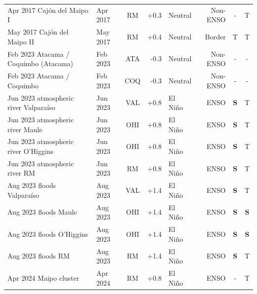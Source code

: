 \begin{table}[H]
\begin{tabular}{p{4.0cm}lcrlrcc}
Apr 2017 Caj\'on del Maipo I & Apr 2017 & RM & +0.3 & Neutral & \textcolor{cohnon}{Non-ENSO} & \textcolor{firenone}{-} & \textcolor{firepartial}{T} \\
May 2017 Caj\'on del Maipo II & May 2017 & RM & +0.4 & Neutral & \textcolor{cohbord}{Border} & \textcolor{firepartial}{T} & \textcolor{firepartial}{T} \\
Feb 2023 Atacama / Coquimbo (Atacama) & Feb 2023 & ATA & -0.3 & Neutral & \textcolor{cohnon}{Non-ENSO} & \textcolor{firenone}{-} & \textcolor{firenone}{-} \\
Feb 2023 Atacama / Coquimbo & Feb 2023 & COQ & -0.3 & Neutral & \textcolor{cohnon}{Non-ENSO} & \textcolor{firenone}{-} & \textcolor{firenone}{-} \\
Jun 2023 atmospheric river Valpara\'iso & Jun 2023 & VAL & +0.8 & El Ni\~no & \textcolor{cohenso}{ENSO} & \textcolor{firesuccess}{\textbf{S}} & \textcolor{firepartial}{T} \\
Jun 2023 atmospheric river Maule & Jun 2023 & OHI & +0.8 & El Ni\~no & \textcolor{cohenso}{ENSO} & \textcolor{firesuccess}{\textbf{S}} & \textcolor{firepartial}{T} \\
Jun 2023 atmospheric river O'Higgins & Jun 2023 & OHI & +0.8 & El Ni\~no & \textcolor{cohenso}{ENSO} & \textcolor{firesuccess}{\textbf{S}} & \textcolor{firepartial}{T} \\
Jun 2023 atmospheric river RM & Jun 2023 & RM & +0.8 & El Ni\~no & \textcolor{cohenso}{ENSO} & \textcolor{firesuccess}{\textbf{S}} & \textcolor{firepartial}{T} \\
Aug 2023 floods Valpara\'iso & Aug 2023 & VAL & +1.4 & El Ni\~no & \textcolor{cohenso}{ENSO} & \textcolor{firesuccess}{\textbf{S}} & \textcolor{firepartial}{T} \\
Aug 2023 floods Maule & Aug 2023 & OHI & +1.4 & El Ni\~no & \textcolor{cohenso}{ENSO} & \textcolor{firesuccess}{\textbf{S}} & \textcolor{firesuccess}{\textbf{S}} \\
Aug 2023 floods O'Higgins & Aug 2023 & OHI & +1.4 & El Ni\~no & \textcolor{cohenso}{ENSO} & \textcolor{firesuccess}{\textbf{S}} & \textcolor{firesuccess}{\textbf{S}} \\
Aug 2023 floods RM & Aug 2023 & RM & +1.4 & El Ni\~no & \textcolor{cohenso}{ENSO} & \textcolor{firesuccess}{\textbf{S}} & \textcolor{firepartial}{T} \\
Apr 2024 Maipo cluster & Apr 2024 & RM & +0.8 & El Ni\~no & \textcolor{cohenso}{ENSO} & \textcolor{firenone}{-} & \textcolor{firepartial}{T} \\
\bottomrule
\end{tabular}
\end{table}


